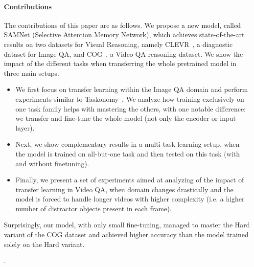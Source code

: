 \paragraph{Contributions}

The contributions of this paper are as follows.
We propose a new model, called SAMNet (Selective Attention Memory Network), which achieves state-of-the-art results on two datasets for Visual Reasoning, namely CLEVR~\cite{johnson2017clevr}, a diagnostic dataset for Image QA, and COG~\cite{yang2018dataset}, a Video QA reasoning dataset.
We show the impact of the different tasks when transferring the whole pretrained model in three main setups.
\begin{itemize}
	\item We first focus on transfer learning within the Image QA domain and perform experiments similar to Taskonomy~\cite{zamir2018taskonomy}. We analyze how training exclusively on one task family helps with mastering the others, with one notable difference: we transfer and fine-tune the whole model (not only the encoder or input layer).
	\item Next, we show complementary results in a multi-task learning setup, when the model is trained on all-but-one task and then tested on this task (with and without finetuning).
	\item Finally, we present a set of experiments aimed at analyzing of the impact of transfer learning in Video QA, when domain changes drastically and the model is forced to handle longer videos with higher complexity (i.e. a higher number of distractor objects present in each frame).
\end{itemize}
Surprisingly, our model, with only small fine-tuning, managed to master the Hard variant of the COG dataset and achieved higher accuracy than the model trained solely on the Hard variant.


.


 
